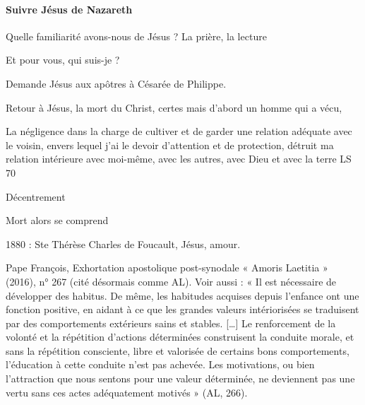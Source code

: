 \paragraph{Suivre Jésus de Nazareth} Quelle familiarité avons-nous de Jésus ? La prière, la lecture 

\begin{singlequote}
    Et pour vous, qui suis-je ?
\end{singlequote}
Demande Jésus aux apôtres à Césarée de Philippe. 

Retour à Jésus, la mort du Christ, certes mais d'abord un homme qui a vécu, 


\begin{singlequote}
    La négligence dans la charge de cultiver et de garder une relation adéquate avec le voisin, envers lequel j’ai le devoir d’attention et de protection, détruit ma relation intérieure avec moi-même, avec les autres, avec Dieu et avec la terre LS 70
\end{singlequote}

Décentrement

Mort alors se comprend

1880 : Ste Thérèse Charles de Foucault, Jésus, amour.


\begin{singlequote}
    Pape François, Exhortation apostolique post-synodale « Amoris Laetitia » (2016), n° 267 (cité désormais comme AL). Voir aussi : « Il est nécessaire de développer des habitus. De même, les habitudes acquises depuis l’enfance ont une fonction positive, en aidant à ce que les grandes valeurs intériorisées se traduisent par des comportements extérieurs sains et stables. […] Le renforcement de la volonté et la répétition d’actions déterminées construisent la conduite morale, et sans la répétition consciente, libre et valorisée de certains bons comportements, l’éducation à cette conduite n’est pas achevée. Les motivations, ou bien l’attraction que nous sentons pour une valeur déterminée, ne deviennent pas une vertu sans ces actes adéquatement motivés » (AL, 266).
\end{singlequote}